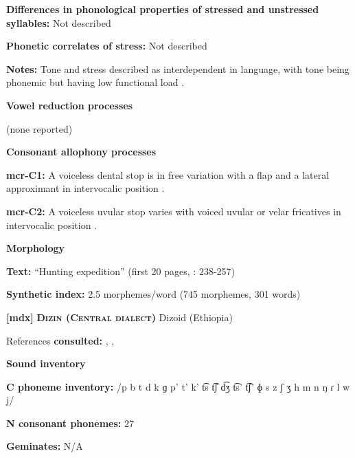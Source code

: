 \textbf{Differences in phonological properties of stressed and unstressed syllables:} Not described



\textbf{Phonetic correlates of stress:} Not described



\textbf{Notes:} Tone and stress described as interdependent in language, with tone being phonemic but having low functional load \citep[226]{Whitehead2004}. 



\textbf{Vowel reduction processes}



(none reported)



\textbf{Consonant allophony processes}



\textbf{mcr-C1:} A voiceless dental stop is in free variation with a flap and a lateral approximant in intervocalic position \citep[9]{Whitehead2004}.



\textbf{mcr-C2:} A voiceless uvular stop varies with voiced uvular or velar fricatives in intervocalic position \citep[9]{Whitehead2004}.



\textbf{Morphology}



\textbf{Text:} “Hunting expedition” (first 20 pages, \citealt{Whitehead2004}: 238-257)



\textbf{Synthetic index:} 2.5 morphemes/word (745 morphemes, 301 words)



\textbf{[mdx]}   \textbf{\textsc{Dizin (Central dialect)}}  Dizoid (Ethiopia)



References \textbf{consulted:} \citet{Allan1976}, \citet{Beachy2005}, \citet{Breeze1988}



\textbf{Sound inventory}



\textbf{C phoneme inventory:} /p b t d k ɡ p’ t’ k’ t͡s t͡ʃ d͡ʒ t͡s’ t͡ʃ’ ɸ s z ʃ ʒ h m n ŋ ɾ l w j/



\textbf{N consonant phonemes:} 27



\textbf{Geminates:} N/A



